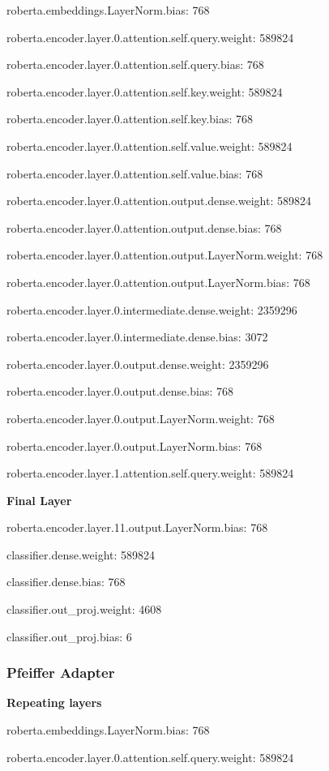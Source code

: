 \documentclass[draft,10pt,twocolumn,letterpaper]{article}
\begin{document}
roberta.embeddings.LayerNorm.bias: 768

roberta.encoder.layer.0.attention.self.query.weight: 589824

roberta.encoder.layer.0.attention.self.query.bias: 768

roberta.encoder.layer.0.attention.self.key.weight: 589824

roberta.encoder.layer.0.attention.self.key.bias: 768

roberta.encoder.layer.0.attention.self.value.weight: 589824

roberta.encoder.layer.0.attention.self.value.bias: 768

roberta.encoder.layer.0.attention.output.dense.weight: 589824

roberta.encoder.layer.0.attention.output.dense.bias: 768

roberta.encoder.layer.0.attention.output.LayerNorm.weight: 768

roberta.encoder.layer.0.attention.output.LayerNorm.bias: 768

roberta.encoder.layer.0.intermediate.dense.weight: 2359296

roberta.encoder.layer.0.intermediate.dense.bias: 3072

roberta.encoder.layer.0.output.dense.weight: 2359296

roberta.encoder.layer.0.output.dense.bias: 768

roberta.encoder.layer.0.output.LayerNorm.weight: 768

roberta.encoder.layer.0.output.LayerNorm.bias: 768

roberta.encoder.layer.1.attention.self.query.weight: 589824


\textbf{Final Layer}

roberta.encoder.layer.11.output.LayerNorm.bias: 768

classifier.dense.weight: 589824

classifier.dense.bias: 768

classifier.out\_proj.weight: 4608

classifier.out\_proj.bias: 6

\subsubsection{Pfeiffer Adapter}
\label{sec:pfeiffermodel} 
\textbf{Repeating layers}

roberta.embeddings.LayerNorm.bias: 768

roberta.encoder.layer.0.attention.self.query.weight: 589824
\end{document}
